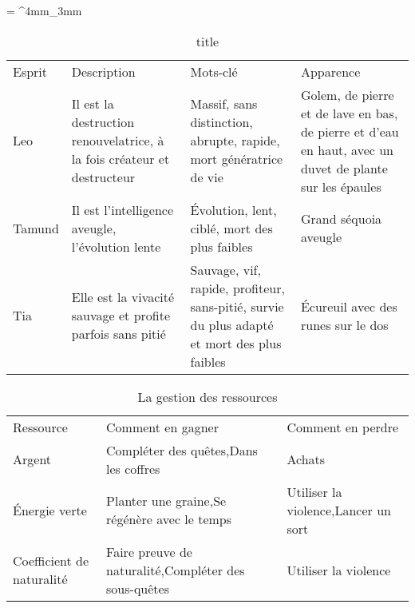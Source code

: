 \documentclass[a4paper, 10pt, oneside, fleqn]{report}
\begin{document}
	
	\everyrow{\tabucline[.4mm  white]{}}
	\tabulinesep = ^4mm_3mm
	
	
\begin{table}
	\newlength{\tableLength}
	\setlength{\tableLength}{\textwidth+2cm}
	\hspace{-1.9cm}\begin{tabu} to 
		\rowfont{\bfseries\sffamily\leavevmode\color{white}}
		Esprit & Description & Mots-clé & Apparence\\
		Leo & Il est la destruction renouvelatrice, à la fois créateur et destructeur & Massif, sans distinction, abrupte, rapide, mort génératrice de vie & Golem, de pierre et de lave en bas, de pierre et d'eau en haut, avec un duvet de plante sur les épaules\\
		Tamund & Il est l'intelligence aveugle, l'évolution lente & Évolution, lent, ciblé, mort des plus faibles & Grand séquoia aveugle\\
		Tia & Elle est la vivacité sauvage et profite parfois sans pitié & Sauvage, vif, rapide, profiteur, sans-pitié, survie du plus adapté et mort des plus faibles & Écureuil avec des runes sur le dos\\
	\end{tabu}
	\caption{title}
	\end{table}
	
	
	\begin{table}[ht!]
		\begin{tabu} to \textwidth {X X[1.2] X[1.2]}
			\rowfont{\bfseries\sffamily\leavevmode\color{white}}
			Ressource & Comment en gagner & Comment en perdre\\
			Argent & Compléter des quêtes,\newline Dans les coffres & Achats\\
			Énergie verte & Planter une graine,\newline Se régénère avec le temps & Utiliser la violence,\newline Lancer un sort\\
			Coefficient de naturalité & Faire preuve de naturalité,\newline Compléter des sous-quêtes & Utiliser la violence\\
		\end{tabu}
		\caption{La gestion des ressources}
	\end{table}
	
\end{document}
